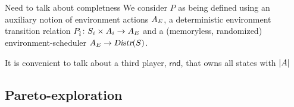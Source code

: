 {\color{red}Need to talk about completness}
\color{black!50}
We consider $P$ as being defined using an auxiliary notion of environment actions $A_E$, a deterministic environment transition relation $P_{\hat{i}}\colon S_i \times A_i \rightarrow A_E$ and a (memoryless, randomized) environment-scheduler $A_E \rightarrow \textsl{Distr}(S)$.



It is convenient to talk about a third player, $\mathsf{rnd}$, that owns all states with $|A|$



\color{black}

\subsection{Pareto-exploration}



